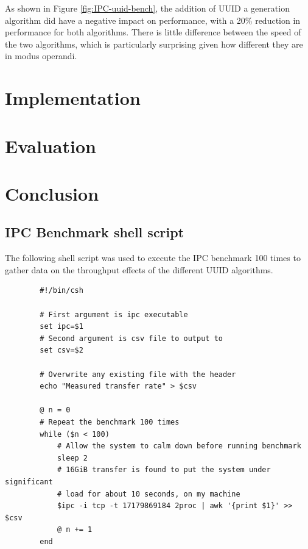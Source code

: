\documentclass[a4paper,12pt,twoside,openright]{report}
\begin{document}
	As shown in Figure \ref{fig:IPC-uuid-bench}, the addition of UUID a generation algorithm did have a negative impact on performance, with a 20\% reduction in performance for both algorithms. There is little difference between the speed of the two algorithms, which is particularly surprising given how different they are in modus operandi.
	
	
	\chapter{Implementation}
	
	
	\chapter{Evaluation}
	
	
	\chapter{Conclusion}
	
	
	
	
	
	
	\begin{appendices}
		\chapter{IPC Benchmark shell script}
		\label{appendix:IPC}
		
		The following shell script was used to execute the IPC benchmark 100 times to gather data on the throughput effects of the different UUID algorithms.
		
		\begin{verbatim}
		#!/bin/csh
		
		# First argument is ipc executable
		set ipc=$1
		# Second argument is csv file to output to
		set csv=$2
		
		# Overwrite any existing file with the header
		echo "Measured transfer rate" > $csv
		
		@ n = 0
		# Repeat the benchmark 100 times
		while ($n < 100)
		    # Allow the system to calm down before running benchmark
		    sleep 2
		    # 16GiB transfer is found to put the system under significant
		    # load for about 10 seconds, on my machine
		    $ipc -i tcp -t 17179869184 2proc | awk '{print $1}' >> $csv
		    @ n += 1
		end
		\end{verbatim}
	\end{appendices}
	
	
	
	
	
	
\end{document}
